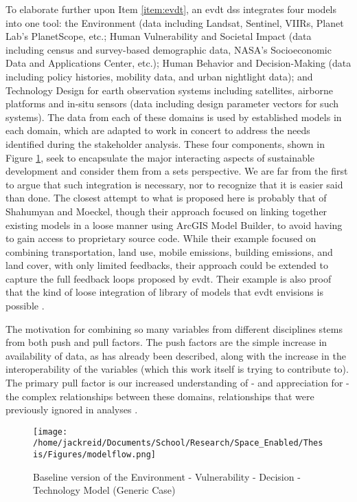 \documentclass[notitlepage]{article}
\begin{document}
To elaborate further upon Item \ref{item:evdt}, an \ac{evdt} \ac{dss} \color{black} integrates four models into one tool: the Environment (data including Landsat, Sentinel, VIIRs, Planet Lab’s PlanetScope, etc.; Human Vulnerability and Societal Impact (data including census and survey-based demographic data, NASA’s Socioeconomic Data and Applications Center, etc.); Human Behavior and Decision-Making (data including policy histories, mobility data, and urban nightlight data); and Technology Design for earth observation systems including satellites, airborne platforms and in-situ sensors (data including design parameter vectors for such systems). The data from each of these domains is used by established models in each domain, which are adapted to work in concert to address the needs identified during the stakeholder analysis. These four components, shown in Figure \ref{fig:model}, seek to encapsulate the major interacting aspects of sustainable development and consider them from a \ac{sets} perspective. We are far from the first to argue that such integration is necessary, nor to recognize that it is easier said than done. The closest attempt to what is proposed here is probably that of Shahumyan and Moeckel, though their approach focused on linking together existing models in a loose manner using ArcGIS Model Builder, to avoid having to gain access to proprietary source code. While their example focused on combining transportation, land use, mobile emissions, building emissions, and land cover, with only limited feedbacks, their approach could be extended to capture the full feedback loops proposed by \ac{evdt}. Their example is also proof that the kind of loose integration of library of models that \ac{evdt} envisions is possible \cite{shahumyanIntegrationLandUse2017}. 

The motivation for combining so many variables from different disciplines stems from both push and pull factors. The push factors are the simple increase in availability of data, as has already been described, along with the increase in the interoperability of the variables (which this work itself is trying to contribute to). The primary pull factor is our increased understanding of - and appreciation for - the complex relationships between these domains, relationships that were previously ignored in analyses \cite{gaheganMultivariateGeovisualization2007}. 

\begin{figure}[h]
    \centering
    \texttt{[image: /home/jackreid/Documents/School/Research/Space\_Enabled/Thesis/Figures/modelflow.png]}
    \caption{ Baseline version of the Environment - Vulnerability - Decision - Technology Model (Generic Case)}
    \label{fig:model}
\end{figure}
\end{document}
